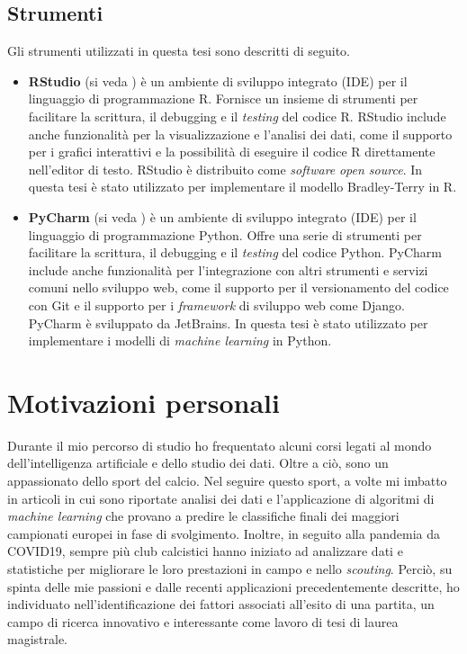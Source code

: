 \subsection{Strumenti}
Gli strumenti utilizzati in questa tesi sono descritti di seguito.
\begin{itemize}
	\item \textbf{RStudio} (si veda \textit{\cite{rstudio}}) è un ambiente di sviluppo integrato (IDE) per il linguaggio di programmazione R. Fornisce un insieme di strumenti per facilitare la scrittura, il debugging e il \emph{testing} del codice R. RStudio include anche funzionalità per la visualizzazione e l'analisi dei dati, come il supporto per i grafici interattivi e la possibilità di eseguire il codice R direttamente nell'editor di testo. RStudio è distribuito come \emph{software} \emph{open source}. In questa tesi è stato utilizzato per implementare il modello Bradley-Terry in R.
	\item \textbf{PyCharm} (si veda \textit{\cite{pycharm}}) è un ambiente di sviluppo integrato (IDE) per il linguaggio di programmazione Python. Offre una serie di strumenti per facilitare la scrittura, il debugging e il \emph{testing} del codice Python. PyCharm include anche funzionalità per l'integrazione con altri strumenti e servizi comuni nello sviluppo web, come il supporto per il versionamento del codice con Git e il supporto per i \emph{framework} di sviluppo web come Django. PyCharm  è sviluppato da JetBrains. In questa tesi è stato utilizzato per implementare i modelli di \emph{machine learning} in Python.
\end{itemize}

\section{Motivazioni personali}
Durante il mio percorso di studio ho frequentato alcuni corsi legati al mondo dell'intelligenza artificiale e dello studio dei dati. Oltre a ciò, sono un appassionato dello sport del calcio. Nel seguire questo sport, a volte mi imbatto in articoli in cui sono riportate analisi dei dati e l'applicazione di algoritmi di \emph{machine learning} che provano a predire le classifiche finali dei maggiori campionati europei in fase di svolgimento. Inoltre, in seguito alla pandemia da COVID19, sempre più club calcistici hanno iniziato ad analizzare dati e statistiche per migliorare le loro prestazioni in campo e nello \emph{scouting}. Perciò, su spinta delle mie passioni e dalle recenti applicazioni precedentemente descritte, ho individuato nell'identificazione dei fattori associati all'esito di una partita, un campo di ricerca innovativo e interessante come lavoro di tesi di laurea magistrale.
